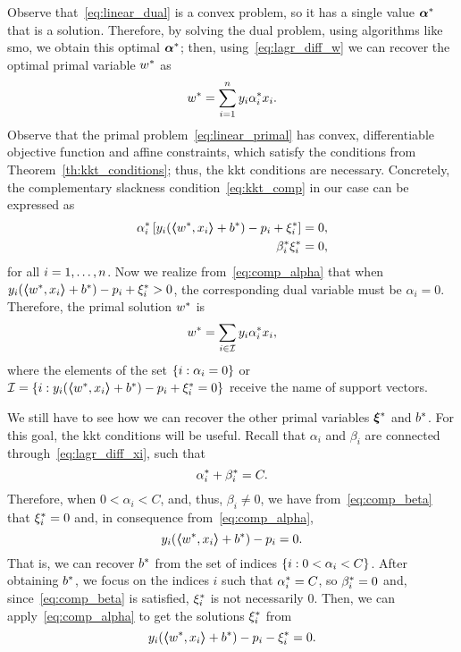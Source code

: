 %
Observe that~\eqref{eq:linear_dual} is a convex problem, so it has a single value ${\bm{\alpha}}^*$ that is a solution. Therefore, by solving the dual problem, using algorithms like \acrshort{smo}, we obtain this optimal ${\bm{\alpha}}^*$; then, using~\eqref{eq:lagr_diff_w} we can recover the optimal primal variable ${w}^*$ as 
\begin{equation}
    \nonumber
    {w}^* = \sum_{i=1}^n y_i {\alpha}^*_i x_i .
\end{equation}
%
Observe that the primal problem~\eqref{eq:linear_primal} has convex, differentiable objective function and affine constraints, which satisfy the conditions from Theorem~\ref{th:kkt_conditions}; thus, the \acrshort{kkt} conditions are necessary.
%
Concretely, the complementary slackness condition~\eqref{eq:kkt_comp} in our case can be expressed as
\begin{align}
    \opt{\alpha}_i \left[ y_i (\dotp{\opt{w}}{x_i} + \opt{b}) - p_i + \opt{\xi}_i \right] = 0 , \label{eq:comp_alpha} \\
    \opt{\beta}_i \opt{\xi}_i = 0 , \label{eq:comp_beta}
\end{align}
for all $i=1, \ldots, n$. 
Now we realize from~\eqref{eq:comp_alpha} that when $y_i (\bm{\left\langle} {w}^*, x_i \bm{\right\rangle} + {b}^*) - p_i + {\xi}^*_i > 0$, the corresponding dual variable must be $\alpha_i = 0$. Therefore, the primal solution ${w}^*$ is 
\begin{equation}
    \nonumber
    {w}^* = \sum_{i \in \mathcal{I}} y_i {\alpha}^*_i x_i ,
\end{equation}
where the elements of the set $\left\{i: \alpha_i = 0\right\}$ or $\mathcal{I} = \left\{i: y_i (\bm{\left\langle} {w}^*, x_i \bm{\right\rangle} + {b}^*) - p_i + {\xi}^*_i = 0\right\}$ receive the name of support vectors.
%

We still have to see how we can recover the other primal variables ${\bm{\xi}}^*$ and ${b}^*$. For this goal, the \acrshort{kkt} conditions will be useful.
Recall that $\alpha_i$ and $\beta_i$ are connected through~\eqref{eq:lagr_diff_xi}, such that 
$$ {\alpha}^*_i + {\beta}^*_i = C .$$
Therefore, when $0 < \alpha_i < C$, and, thus, $\beta_i \neq 0$, we have from~\eqref{eq:comp_beta} that ${\xi}^*_i = 0$ and, in consequence from~\eqref{eq:comp_alpha},
\begin{equation}
    \nonumber
    y_i (\bm{\left\langle} {w}^*, x_i \bm{\right\rangle} + {b}^*) - p_i = 0 .
\end{equation}
That is, we can recover ${b}^*$ from the set of indices $\left\{i: 0 < \alpha_i < C\right\}$.
%
After obtaining ${b}^*$, we focus on the indices $i$ such that ${\alpha}^*_i = C$, so ${\beta}^*_i = 0$ and, since~\eqref{eq:comp_beta} is satisfied, ${\xi}^*_i$ is not necessarily $0$. Then, we can apply~\eqref{eq:comp_alpha} to get the solutions ${\xi}^*_i$ from 
\begin{equation}
    \nonumber
    y_i (\bm{\left\langle} {w}^*, x_i \bm{\right\rangle} + {b}^*) - p_i - {\xi}^*_i = 0 .
\end{equation}

